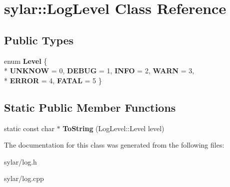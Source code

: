 \hypertarget{classsylar_1_1LogLevel}{\section{sylar\-:\-:Log\-Level Class Reference}
\label{classsylar_1_1LogLevel}
}
\subsection*{Public Types}
\begin{DoxyCompactItemize}
\item 
enum {\bfseries Level} \{ \\*
{\bfseries U\-N\-K\-N\-O\-W} = 0, 
{\bfseries D\-E\-B\-U\-G} = 1, 
{\bfseries I\-N\-F\-O} = 2, 
{\bfseries W\-A\-R\-N} = 3, 
\\*
{\bfseries E\-R\-R\-O\-R} = 4, 
{\bfseries F\-A\-T\-A\-L} = 5
 \}
\end{DoxyCompactItemize}
\subsection*{Static Public Member Functions}
\begin{DoxyCompactItemize}
\item 
\hypertarget{classsylar_1_1LogLevel_afdaae0e121441591b8578718ad63de81}{static const char $\ast$ {\bfseries To\-String} (Log\-Level\-::\-Level level)}\label{classsylar_1_1LogLevel_afdaae0e121441591b8578718ad63de81}

\end{DoxyCompactItemize}


The documentation for this class was generated from the following files\-:\begin{DoxyCompactItemize}
\item 
sylar/log.\-h\item 
sylar/log.\-cpp\end{DoxyCompactItemize}
